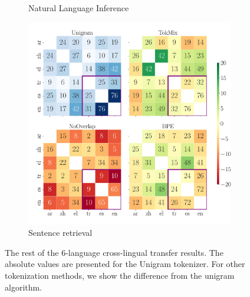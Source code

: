 \begin{figure}[tb!]
\begin{subfigure}[b]{1.0\linewidth}
        \caption{Natural Language Inference}
        \label{fig:xnli_transfer}
    \end{subfigure}
    \begin{subfigure}[b]{1.0\linewidth}
        \centering
        \includegraphics[width=0.9\linewidth]{figures/Tatoeba_Acc_transfer_.pdf}
        
        \caption{Sentence retrieval}
        \label{fig:tatoeba_transfer}
    \end{subfigure}
    \caption{The rest of the 6-language cross-lingual transfer results. The absolute values are presented for the Unigram tokenizer. For other tokenization methods, we show  the difference from the unigram algorithm.}
\end{figure}
